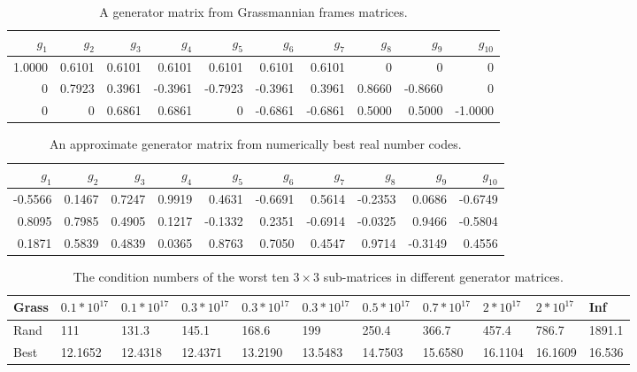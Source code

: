 \documentclass{sig-alternate}
\begin{document}
\begin{table}[ht]
\caption{A generator matrix from Grassmannian frames 
matrices.}
\begin{center}
\begin{tabular}{|r|r|r|r|r|r|r|r|r|r|}
\hline
$g_1$ & $g_2$ & $g_3$ & $g_4$ & $g_5$ & $g_6$ & $g_7$ & $g_8$ & $g_9$ &$g_{10}$ \\
\hline
    1.0000   & 0.6101    &0.6101   & 0.6101   & 0.6101  &  0.6101   & 0.6101   &      0 &        0   &      0  \\
         0   & 0.7923    &0.3961   &-0.3961   &-0.7923  & -0.3961   & 0.3961  &  0.8660 &  -0.8660  &       0  \\
         0   &      0    &0.6861   &0.6861    &     0   &-0.6861   &-0.6861   & 0.5000  &  0.5000   &-1.0000   \\
\hline
\end{tabular}
\end{center}
\end{table}


\begin{table}[ht]
\caption{An approximate generator matrix from numerically best real number codes.}
\begin{center}
\begin{tabular}{|r|r|r|r|r|r|r|r|r|r|}
\hline
$g_1$ & $g_2$ & $g_3$ & $g_4$ & $g_5$ & $g_6$ & $g_7$ & $g_8$ & $g_9$ &$g_{10}$ \\
\hline
   -0.5566    &0.1467   & 0.7247  &  0.9919  &  0.4631  & -0.6691 &   0.5614  & -0.2353  &  0.0686 &  -0.6749  \\
    0.8095    &0.7985   & 0.4905  &  0.1217  & -0.1332  & 0.2351  &  -0.6914  & -0.0325  &  0.9466 &  -0.5804  \\
    0.1871    &0.5839   & 0.4839  &  0.0365  &  0.8763  &  0.7050 &   0.4547  &  0.9714  & -0.3149 &   0.4556  \\
\hline
\end{tabular}
\end{center}
\end{table}


\begin{table}[ht]
\caption{The condition numbers of the worst ten $3\times3$ sub-matrices in different generator matrices.}
\begin{center}
\begin{tabular}{|l|l|l|l|l|l|l|l|l|l|l|}
\hline
Grass        &$0.1*10^{17}$ &$0.1*10^{17}$ &$0.3*10^{17}$ &$0.3*10^{17}$ &$0.3*10^{17}$  
             &$0.5*10^{17}$ &$0.7*10^{17}$ &$2*10^{17}$ &$2*10^{17}$ & Inf   \\
\hline
Rand         &111     &131.3   &145.1   &168.6   &199     &250.4   &366.7   &457.4   &786.7   &1891.1  \\
\hline
Best         &12.1652 &12.4318 &12.4371 &13.2190 &13.5483 &14.7503 &15.6580 &16.1104 &16.1609 &16.536 \\
\hline
\end{tabular}
\end{center}
\end{table}
\end{document}
